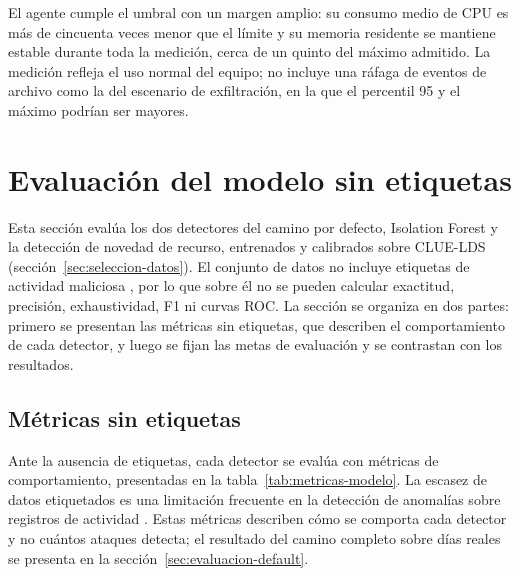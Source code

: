 El agente cumple el umbral con un margen amplio: su consumo medio de CPU es más de cincuenta veces menor que el límite y su memoria residente se mantiene estable durante toda la medición, cerca de un quinto del máximo admitido. La medición refleja el uso normal del equipo; no incluye una ráfaga de eventos de archivo como la del escenario de exfiltración, en la que el percentil 95 y el máximo podrían ser mayores.

\section{Evaluación del modelo sin etiquetas}
\label{sec:evaluacion-modelo}

Esta sección evalúa los dos detectores del camino por defecto, Isolation Forest y la detección de novedad de recurso, entrenados y calibrados sobre CLUE-LDS (sección~\ref{sec:seleccion-datos}). El conjunto de datos no incluye etiquetas de actividad maliciosa \parencite{Landauer2022Dataset}, por lo que sobre él no se pueden calcular exactitud, precisión, exhaustividad, F1 ni curvas ROC. La sección se organiza en dos partes: primero se presentan las métricas sin etiquetas, que describen el comportamiento de cada detector, y luego se fijan las metas de evaluación y se contrastan con los resultados.

\subsection{Métricas sin etiquetas}\label{sec:metricas-no-supervisadas}
Ante la ausencia de etiquetas, cada detector se evalúa con métricas de comportamiento, presentadas en la tabla~\ref{tab:metricas-modelo}. La escasez de datos etiquetados es una limitación frecuente en la detección de anomalías sobre registros de actividad \parencite{Landauer2023Survey}. Estas métricas describen cómo se comporta cada detector y no cuántos ataques detecta; el resultado del camino completo sobre días reales se presenta en la sección~\ref{sec:evaluacion-default}.

